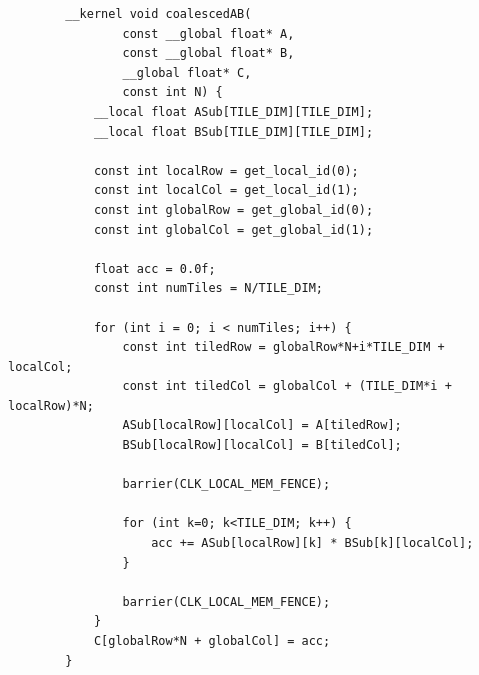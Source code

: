 \documentclass[review=false, sigchi]{acmart}
\begin{document}
\begin{appendix}
		\begin{lstlisting}
		__kernel void coalescedAB(
				const __global float* A,
				const __global float* B,
				__global float* C,
				const int N) {
			__local float ASub[TILE_DIM][TILE_DIM];
			__local float BSub[TILE_DIM][TILE_DIM];    
			
			const int localRow = get_local_id(0);
			const int localCol = get_local_id(1);
			const int globalRow = get_global_id(0);
			const int globalCol = get_global_id(1);
			
			float acc = 0.0f;
			const int numTiles = N/TILE_DIM;
			
			for (int i = 0; i < numTiles; i++) {
				const int tiledRow = globalRow*N+i*TILE_DIM + localCol;
				const int tiledCol = globalCol + (TILE_DIM*i + localRow)*N;
				ASub[localRow][localCol] = A[tiledRow];
				BSub[localRow][localCol] = B[tiledCol];
				
				barrier(CLK_LOCAL_MEM_FENCE);
				
				for (int k=0; k<TILE_DIM; k++) {
					acc += ASub[localRow][k] * BSub[k][localCol];
				}
				
				barrier(CLK_LOCAL_MEM_FENCE);
			}
			C[globalRow*N + globalCol] = acc;
		}
		\end{lstlisting}
	\end{appendix}
	
\end{document}
